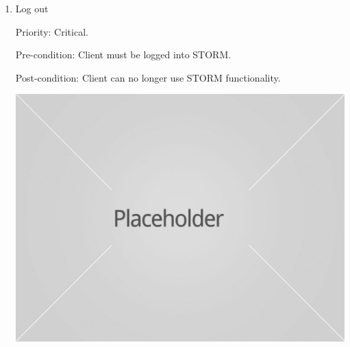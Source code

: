 \begin{enumerate}
    \rule{0\linewidth}{0.15\linewidth}\par
\item Log out\par
Priority: Critical.\par
Pre-condition: Client must be logged into STORM.\par
Post-condition: Client can no longer use STORM functionality.\par
\includegraphics[width=13cm]{image.jpg}
    \rule{0\linewidth}{0.15\linewidth}\par
\end{enumerate}

